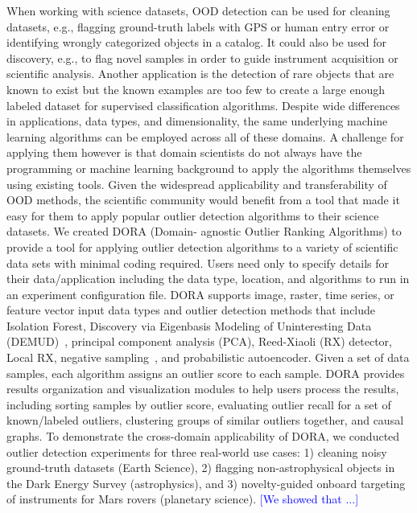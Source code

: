 \documentclass[letterpaper]{article} %
\newcommand{\todo}[1]{\textcolor{blue}{#1}}
\begin{document}
   When working with science datasets, OOD detection can be used for 
   cleaning datasets, e.g., flagging ground-truth labels with GPS or human
    entry error or identifying wrongly categorized objects in a catalog. 
    It could also be used for discovery, e.g., to flag novel samples in order 
    to guide instrument acquisition or scientific analysis. Another application
   is the detection of rare objects that are known to exist but the known
   examples are too few to create a large enough labeled dataset for 
   supervised classification algorithms. 
  Despite wide differences in applications, data types, and dimensionality,
 the same underlying machine learning algorithms can be employed across 
 all of these domains. A challenge for applying them however is that domain
 scientists do not always have the programming or machine learning background
 to apply the algorithms themselves using existing tools. Given the widespread 
 applicability and transferability of OOD methods, the scientific community 
 would benefit from a tool that made it easy for them to apply popular outlier
 detection algorithms to their science datasets. We created DORA (Domain-
 agnostic Outlier Ranking Algorithms) to provide a tool for applying outlier 
 detection algorithms to a variety of scientific data sets with minimal coding
 required. Users need only to specify details for their data/application 
 including the data type, location, and algorithms to run in an experiment
 configuration file. DORA supports image, raster, time series, 
or feature vector input data types and outlier detection methods that include
 Isolation Forest, Discovery via Eigenbasis Modeling of Uninteresting Data 
 (DEMUD)~\citep{wagstaff:demud13}, principal component analysis (PCA),
   Reed-Xiaoli (RX) detector,  
 Local RX, negative sampling~\cite{sipple:neg-sampling20}, and probabilistic 
 autoencoder. Given a set of data samples, each algorithm assigns an outlier 
 score to each sample. DORA provides results organization and visualization 
 modules to help users process the results, including sorting samples by outlier 
 score, evaluating outlier recall for a set of known/labeled outliers, clustering 
 groups of similar outliers together, and causal graphs. To demonstrate the 
 cross-domain applicability of DORA, we conducted outlier detection experiments 
 for three real-world use cases: 1) cleaning noisy ground-truth datasets (Earth 
 Science), 2) flagging non-astrophysical objects in the Dark Energy Survey 
 (astrophysics), and 3) novelty-guided onboard targeting of instruments for Mars 
 rovers (planetary science). \todo{[We showed that ...]}
\end{document}
